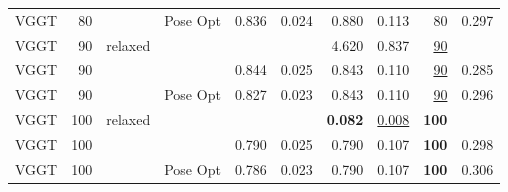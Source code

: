 \begin{table}[H]
\begin{tabular}{lrllrrrrrr}
VGGT & 80 &  & Pose Opt & 0.836 & 0.024 & 0.880 & 0.113 & 80 & 0.297 \\
VGGT & 90 & relaxed &  &  &  & 4.620 & 0.837 & \underline{90} &  \\
VGGT & 90 &  &  & 0.844 & 0.025 & 0.843 & 0.110 & \underline{90} & 0.285 \\
VGGT & 90 &  & Pose Opt & 0.827 & 0.023 & 0.843 & 0.110 & \underline{90} & 0.296 \\
VGGT & 100 & relaxed &  &  &  & \textbf{0.082} & \underline{0.008} & \textbf{100} &  \\
VGGT & 100 &  &  & 0.790 & 0.025 & 0.790 & 0.107 & \textbf{100} & 0.298 \\
VGGT & 100 &  & Pose Opt & 0.786 & 0.023 & 0.790 & 0.107 & \textbf{100} & 0.306 \\
\bottomrule
\end{tabular}
\end{table}
